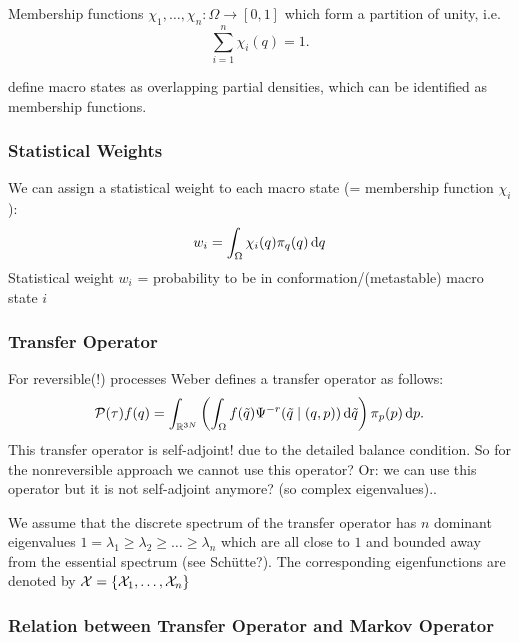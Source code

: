 Membership functions $\chi_1,\dots,\chi_n : \Omega \rightarrow [0,1]$ which form a partition of unity, i.e.
\begin{equation}
\sum_{i=1}^n \chi_i(q) = 1.
\end{equation}

define macro states as overlapping partial densities, which can be identified as membership functions.


\subsubsection*{Statistical Weights}
We can assign a statistical weight to each macro state 
(= membership function $\chi_i$): 
\begin{equation}
w_i = \int_\Omega \chi_i(q) \pi_q(q) \mathop{}\!\mathrm{d} q
\end{equation}
Statistical weight $w_i$ = probability to be in conformation/(metastable) macro state $i$

\subsubsection*{Transfer Operator}
For reversible(!) processes Weber \cite{weber2011subspace} defines a transfer operator as follows:
\begin{equation}
\label{eq:transferoperator}
\mathcal{P}(\tau)f(q) = \int_{\mathbb{R}^{3N}} \left( \int_\Omega f(\tilde{q})\Psi^{-r}(\tilde{q}\mid (q,p)) \mathop{}\!\mathrm{d} \tilde{q} \right) \pi_p(p)\mathop{}\!\mathrm{d} p.
\end{equation}
This transfer operator is self-adjoint! due to the detailed balance condition. 
So for the nonreversible approach we cannot use this operator?
Or: we can use this operator but it is not self-adjoint anymore? (so complex eigenvalues)..

We assume that the discrete spectrum of the transfer operator has $n$ dominant eigenvalues
$1 = \lambda_1 \geq \lambda_2 \geq \dots \geq \lambda_n$ which are all close to $1$ and bounded away from the essential spectrum (see Sch\"utte?). 
The corresponding eigenfunctions are denoted by $\mathcal{X} = \{ \mathcal{X}_1,\dots, \mathcal{X}_n\}$

\subsubsection*{Relation between Transfer Operator and Markov Operator}

